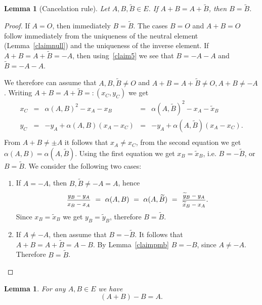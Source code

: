 \documentclass[12pt]{amsart}
\theoremstyle{plain}
\newtheorem{lemma}[theorem]{Lemma}
\theoremstyle{remark}
\theoremstyle{definition}
\newcommand{\smfrac}[2]{\mbox{\footnotesize$\displaystyle\frac{#1}{#2}$}}
\def\a{\alpha}
\def\bn{\begin{enumerate}}
\def\en{\end{enumerate}}
\def\a{\alpha}
\def\ti{\widetilde}
\begin{document}
\begin{lemma}[Cancelation rule] \label{claim3}
Let $A,B,\widetilde{B} \in E$.
If $A+B=A+\widetilde B$, then $B=\widetilde B$.
\end{lemma}


\begin{proof}
If $A=O$, then immediately $B=\widetilde B$.
The cases $B=O$ and $A+B=O$ follow immediately from the uniqueness of the neutral element
(Lemma~\ref{claimnull}) and the uniqueness of the inverse element.
If $A+B=A+\widetilde B=-A$, then using~\ref{claim5} we see that $B=-A-A$ and $\widetilde B=-A-A$.

We therefore can assume that $A,B,\ti{B} \ne O$
 and $A+B=A+\widetilde B \ne O, A+B\ne -A$. Writing $A+B=A+\widetilde B=:(x_C,y_C)$
we get
      \[
      \begin{array}{rcccl}
       x_C&=&\alpha(A,B)^2-x_A-x_B&=&\alpha(A,\ti{B})^2-x_A-\widetilde x_B \\
       y_C&=&-y_A+\alpha(A,B)(x_A-x_C)&=&-y_A+\alpha(A,\ti{B})(x_A-x_C).\\
      \end {array}
      \]
      From $A+B \neq \pm A$ it follows that $x_A \neq x_C$, from the second equation we get $\a(A,B)=\a(A,\ti{B})$.
      Using the first equation we get  $x_B=\widetilde x_B$, i.e.
      $B=-\widetilde B$, or $B=\widetilde B$.
      We consider the following two cases:
      \bn
      \item If $A=-A$, then $B, \widetilde B \neq -A=A$, hence
            \[ \smfrac{y_B-y_A}{x_B-x_A}\,\,=\,\,\alpha(A,B)\,\,=\,\,\alpha(A,\ti{B})\,\,=\,\,
               \smfrac{\widetilde y_B-y_A}{\widetilde x_B-x_A}. \]
            Since $x_B=\widetilde x_B$ we get $y_B=\widetilde y_B$, therefore
            $B=\widetilde B$.
      \item If $A \neq -A$, then assume that $B=-\widetilde B$. It follows that
            $A+B=A+\widetilde B=A-B$.
            By Lemma~\ref{claimpmb} $B=-B$, since $A \neq -A$. Therefore $B=\widetilde B$.\qedhere
      \en
\end{proof}


\begin{lemma} \label{claim4}
For any $A,B \in E$ we have
\[ (A+B)-B=A. \]
\end{lemma}
\end{document}
